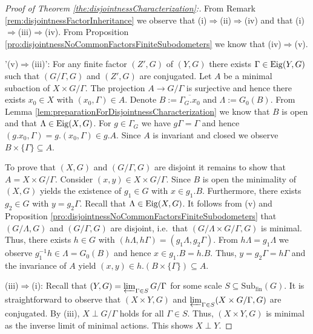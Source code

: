 \documentclass[12pt, reqno]{amsart}
\theoremstyle{definition}
\theoremstyle{remark}
\numberwithin{equation}{section}
\theoremstyle{theorem}
\theoremstyle{remark}
\def\subfin{{\operatorname{Sub_{fin}}}}
\def\Eig{{\rm Eig}}
\begin{document}
\begin{proof}[Proof of Theorem \ref{the:disjointnessCharacterization}:]
    From Remark \ref{rem:disjointnessFactorInheritance} we observe that 
    (i)$\Rightarrow$(ii)$\Rightarrow$(iv) 
    and that 
    (i)$\Rightarrow$(iii)$\Rightarrow$(iv).
    From Proposition \ref{pro:disjointnessNoCommonFactorsFiniteSubodometers} we know that (iv)$\Rightarrow$(v). 

'(v)$\Rightarrow$(iii)':
    For any finite factor $(Z',G)$ of $(Y,G)$ there exists $\Gamma\in \Eig(Y,G)$ such that $(G/\Gamma,G)$ and $(Z',G)$ are conjugated. 
    Let $A$ be a minimal subaction of $X\times G/\Gamma$. 
    The projection $A\to G/\Gamma$ is surjective and hence there exists $x_0\in X$ with $(x_0,\Gamma)\in A$. 
    Denote $B:=\overline{\Gamma_G.x_0}$ and $\Lambda:=G_0(B)$. 
    From Lemma \ref{lem:preparationForDisjointnessCharacterization} we know that $B$ is open and that $\Lambda\in \Eig(X,G)$. 
    For $g\in \Gamma_G$ we have $g\Gamma=\Gamma$ and hence $(g.x_0,\Gamma)=g.(x_0,\Gamma)\in g.A$. 
    Since $A$ is invariant and closed we observe $B\times \{\Gamma\}\subseteq A$. 

    To prove that $(X,G)$ and $(G/\Gamma,G)$ are disjoint it remains to show that $A=X\times G/\Gamma$. 
    Consider $(x,y)\in X\times G/\Gamma$. Since $B$ is open the minimality of $(X,G)$ yields the existence of $g_1\in G$ with $x\in g_1.B$. 
    Furthermore, there exists $g_2\in G$ with $y=g_2\Gamma$. 
    Recall that $\Lambda\in \Eig(X,G)$.
    It follows from (v) and Proposition \ref{pro:disjointnessNoCommonFactorsFiniteSubodometers} that $(G/\Lambda,G)$ and $(G/\Gamma,G)$ are disjoint, i.e.\ that $(G/\Lambda\times G/\Gamma,G)$ is minimal. 
    Thus, there exists $h\in G$ with $(h\Lambda,h\Gamma)=(g_1\Lambda,g_2\Gamma)$.
    From $h\Lambda=g_1\Lambda$ we observe $g_1^{-1}h\in \Lambda=G_0(B)$ and hence $x\in g_1.B=h.B$. 
    Thus, $y=g_2\Gamma=h\Gamma$ and the invariance of $A$ yield
    $(x,y)\in h.(B\times \{\Gamma\})\subseteq A$. 

(iii)$\Rightarrow$(i): 
    Recall that $(Y,G)=\varprojlim_{\Gamma\in S} G/\Gamma$ for some scale $S\subseteq \subfin(G)$. 
    It is straightforward to observe that $(X\times Y,G)$ and $\varprojlim_{\Gamma\in S} (X\times G/\Gamma, G)$ are conjugated. 
    By (iii), $X\perp G/\Gamma$ holds for all $\Gamma\in S$.
    Thus, $(X\times Y,G)$ is minimal as the inverse limit of minimal actions. This shows $X\perp Y$. 
\end{proof}
\end{document}
